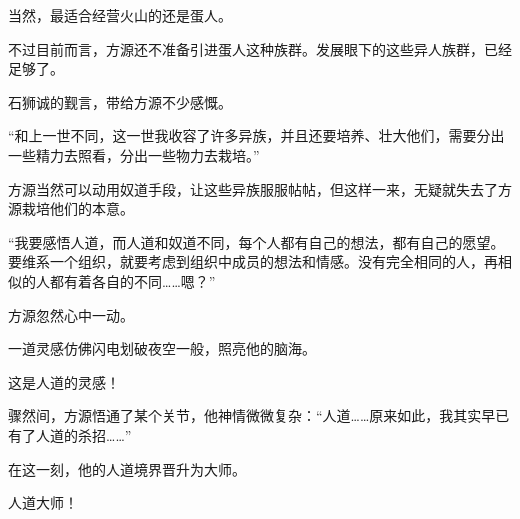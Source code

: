 \begin{this_body}
当然，最适合经营火山的还是蛋人。

不过目前而言，方源还不准备引进蛋人这种族群。发展眼下的这些异人族群，已经足够了。

石狮诚的觐言，带给方源不少感慨。

“和上一世不同，这一世我收容了许多异族，并且还要培养、壮大他们，需要分出一些精力去照看，分出一些物力去栽培。”

方源当然可以动用奴道手段，让这些异族服服帖帖，但这样一来，无疑就失去了方源栽培他们的本意。

“我要感悟人道，而人道和奴道不同，每个人都有自己的想法，都有自己的愿望。要维系一个组织，就要考虑到组织中成员的想法和情感。没有完全相同的人，再相似的人都有着各自的不同……嗯？”

方源忽然心中一动。

一道灵感仿佛闪电划破夜空一般，照亮他的脑海。

这是人道的灵感！

骤然间，方源悟通了某个关节，他神情微微复杂：“人道……原来如此，我其实早已有了人道的杀招……”

在这一刻，他的人道境界晋升为大师。

人道大师！

\end{this_body}

